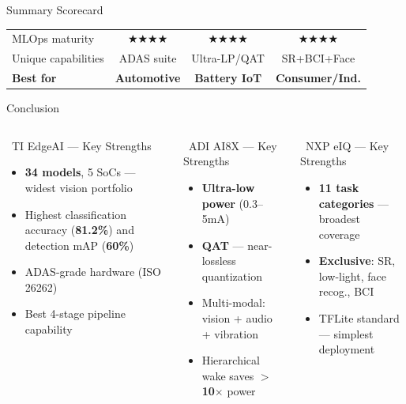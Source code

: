 \documentclass[aspectratio=169]{beamer}
\begin{document}
\begin{frame}{Summary Scorecard}
\begin{center}
\begin{tabular}{lccc}
MLOps maturity & $\bigstar\bigstar\bigstar\bigstar$ & $\bigstar\bigstar\bigstar\bigstar$ & $\bigstar\bigstar\bigstar\bigstar$\\
Unique capabilities & ADAS suite & Ultra-LP/QAT & SR+BCI+Face\\
\midrule
\textbf{Best for} & \textbf{Automotive} & \textbf{Battery IoT} & \textbf{Consumer/Ind.}\\
\bottomrule
\end{tabular}
\end{center}
\end{frame}

\begin{frame}{Conclusion}
\begin{columns}
\begin{block}{\textcolor{TIRed}{\faCheckCircle}\ TI EdgeAI --- Key Strengths}
\begin{itemize}
  \item \textbf{34 models}, 5 SoCs --- widest vision portfolio
  \item Highest classification accuracy (\textbf{81.2\%}) and detection mAP (\textbf{60\%})
  \item ADAS-grade hardware (ISO 26262)
  \item Best 4-stage pipeline capability
\end{itemize}
\end{block}
\begin{block}{\textcolor{ADIBlue}{\faCheckCircle}\ ADI AI8X --- Key Strengths}
\begin{itemize}
  \item \textbf{Ultra-low power} (0.3--5mA)
  \item \textbf{QAT} --- near-lossless quantization
  \item Multi-modal: vision + audio + vibration
  \item Hierarchical wake saves \textbf{$>$10$\times$} power
\end{itemize}
\end{block}
\begin{block}{\textcolor{NXPOrange}{\faCheckCircle}\ NXP eIQ --- Key Strengths}
\begin{itemize}
  \item \textbf{11 task categories} --- broadest coverage
  \item \textbf{Exclusive}: SR, low-light, face recog., BCI
  \item TFLite standard --- simplest deployment

\end{itemize}
\end{block}
\end{columns}
\end{frame}
\end{document}
